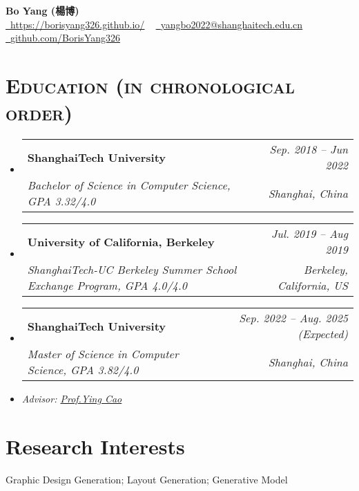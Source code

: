 \documentclass[letterpaper,11pt]{article}
\makeatletter
\newcommand{\resumeSubheading}[4]{
  \item
    \begin{tabular*}{1.0\textwidth}[t]{l@{\extracolsep{\fill}}r}
      \textbf{#1} & \textit{\small #2} \\
      \textit{\small#3} & \textit{\small #4} \\
    \end{tabular*}\vspace{-3pt}
}
\newcommand{\resumeSubHeadingListStart}{\begin{itemize}[leftmargin=0.0in, label={}]}
\newcommand{\resumeSubHeadingListEnd}{\end{itemize}}
\makeatother
\begin{document}

{\huge \textbf{Bo Yang (楊博)}} \\ \vspace{6pt}
\small  
\href{https://borisyang326.github.io/}{\raisebox{-0.2\height}\faHome\  \underline{https://borisyang326.github.io/}} ~
\href{mailto:borisyang326@gmail.com}{\raisebox{-0.2\height}\faEnvelope\  \underline{yangbo2022@shanghaitech.edu.cn}} ~ 
\href{https://github.com/BorisYang326}{\raisebox{-0.2\height}\faGithub\ \underline{github.com/BorisYang326}}
\vspace{-2pt}


\section{\textsc{Education (in chronological order)}}
  \resumeSubHeadingListStart
  \resumeSubheading
      {ShanghaiTech University}{Sep. 2018 -- Jun 2022}
      {Bachelor of Science in Computer Science, GPA 3.32/4.0}{Shanghai, China}
  \resumeSubheading
      {University of California, Berkeley}{Jul. 2019 -- Aug 2019}
      {ShanghaiTech‑UC Berkeley Summer School Exchange Program, GPA 4.0/4.0}{Berkeley, California, US}
    
    \resumeSubheading
      {ShanghaiTech University}{Sep. 2022 -- Aug. 2025 (Expected)}
      {Master of Science in Computer Science, GPA 3.82/4.0}{Shanghai, China}
      \item \small{\textit{Advisor: \href{https://www.ying-cao.com/}{Prof.Ying Cao}}}
    
  \resumeSubHeadingListEnd
  \vspace{-12pt}

\section{Research Interests}
    \qquad Graphic Design Generation; Layout Generation; Generative Model
    \vspace{-6pt}
\end{document}
